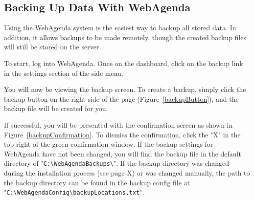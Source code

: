 \documentclass[a4paper,10pt]{report}
\begin{document}
\subsection{Backing Up Data With WebAgenda}

\par \noindent \hspace*{1cm} Using the WebAgenda system is the easiest way to backup all stored data. In addition, it allows backups to be made remotely, though the created backup files will still be stored on the server.
\bigskip
\par \noindent \hspace*{1cm} To start, log into WebAgenda.  Once on the dashboard, click on the backup link in the settings section of the side menu.
\bigskip
\par \noindent \hspace*{1cm} You will now be viewing the backup screen.  To create a backup, simply click the backup button on the right side of the page (Figure~\ref{backupButton}), and the backup file will be created for you.
\bigskip
\par \noindent \hspace*{1cm} If successful, you will be presented with the confirmation screen as shown in  Figure~\ref{backupConfirmation}. To dismiss the confirmation, click the "X" in the top right of the green confirmation window.  If the backup settings for WebAgenda have not been changed, you will find the backup file in the default directory of "\verb|C:\WebAgendaBackups\|".  If the backup directory was changed during the installation process (see page X) or was changed manually, the path to the backup directory can be found in the backup config file at "\verb|C:\WebAgendaConfig\backupLocations.txt|".
\end{document}
